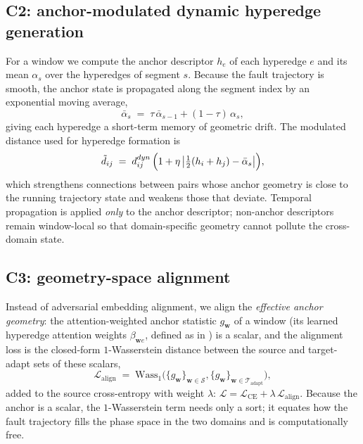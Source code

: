\subsection{C2: anchor-modulated dynamic hyperedge generation}
\label{sec:c2}

For a window we compute the anchor descriptor $h_e$ of each hyperedge
$e$ and its mean $\alpha_s$ over the hyperedges of segment $s$. Because the fault
trajectory is smooth, the anchor state is propagated along the segment index by
an exponential moving average,
\begin{equation}
  \bar\alpha_s \;=\; \tau\,\bar\alpha_{s-1} + (1-\tau)\,\alpha_s,
\label{eq:ema}
\end{equation}
giving each hyperedge a short-term memory of geometric drift. The modulated
distance used for hyperedge formation is
\begin{equation}
  \tilde d_{ij} \;=\; d^{dyn}_{ij}\,\Bigl(1 + \eta\,\bigl|\tfrac{1}{2}
  (h_i + h_j) - \bar\alpha_s\bigr|\Bigr),
\label{eq:mod}
\end{equation}
which strengthens connections between pairs whose anchor geometry is close to
the running trajectory state and weakens those that deviate. Temporal
propagation is applied \emph{only} to the anchor descriptor; non-anchor
descriptors remain window-local so that domain-specific geometry cannot pollute
the cross-domain state.

\subsection{C3: geometry-space alignment}
\label{sec:c3}

Instead of adversarial embedding alignment, we align the \emph{effective anchor
geometry}: the attention-weighted anchor statistic $g_{\bm w}$ of a window
(its learned hyperedge attention weights $\beta_{\bm w e}$, defined as in
\cite{vaswani2017}) is a scalar, and the alignment loss is the closed-form
$1$-Wasserstein distance between the source and target-adapt sets of these
scalars,
\begin{equation}
  \mathcal{L}_{\mathrm{align}} \;=\; \mathrm{Wass}_1\!\bigl(\{g_{\bm w}\}_{\bm w\in
  \mathcal{S}}, \{g_{\bm w}\}_{\bm w \in \mathcal{T}_{\mathrm{adapt}}}\bigr),
\label{eq:align}
\end{equation}
added to the source cross-entropy with weight $\lambda$:
$\mathcal{L}=\mathcal{L}_{\mathrm{CE}}+\lambda\,\mathcal{L}_{\mathrm{align}}$.
Because the anchor is a scalar, the $1$-Wasserstein term needs only a sort;
it equates how the fault trajectory fills the phase space in the two domains and
is computationally free.

